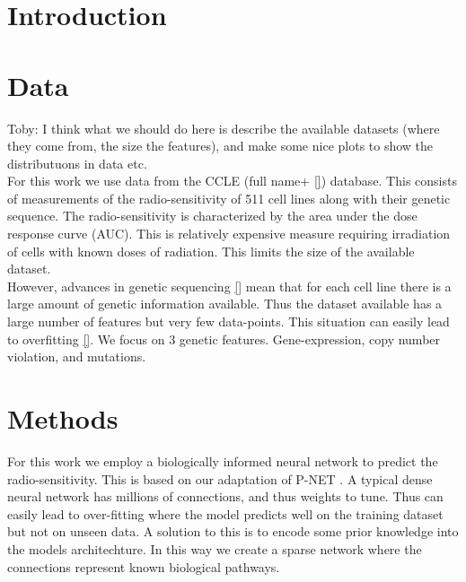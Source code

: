 \documentclass[NOTE, disdraft=true, UKenglish]{\DISCDTLATEXPATH UCLCDTDISdoc}
\begin{document}
\maketitle

\tableofcontents

\clearpage


\newpage

\newpage
\section{Introduction}
\label{sec:introduction}
%
\section{Data}
\label{sec:data}
{\color{red}Toby: I think what we should do here is describe the available datasets (where they come from, the size the features), and make some nice plots to show the distributuons in data etc.}
\\
For this work we use data from the CCLE (full name+ \ref{}) database. This consists of measurements of the radio-sensitivity of 511 cell lines along with their genetic sequence. The radio-sensitivity is characterized by the area under the dose response curve (AUC). This is relatively expensive measure requiring irradiation of cells with known doses of radiation. This limits the size of the available dataset. 
\\ \indent However, advances in genetic sequencing \ref{} mean that for each cell line there is a large amount of genetic information available. Thus the dataset available has a large number of features but very few data-points. This situation can easily lead to overfitting \ref{}. We focus on 3 genetic features. Gene-expression, copy number violation, and mutations.
\section{Methods}
\label{sec:method}
For this work we employ a biologically informed neural network to predict the radio-sensitivity. This is based on our adaptation of P-NET \cite{}. A typical dense neural network has millions of connections, and thus weights to tune. Thus can easily lead to over-fitting where the model predicts well on the training dataset but not on unseen data. A solution to this is to encode some prior knowledge into the models architechture. In this way we create a sparse network where the connections represent known biological pathways.
\end{document}
